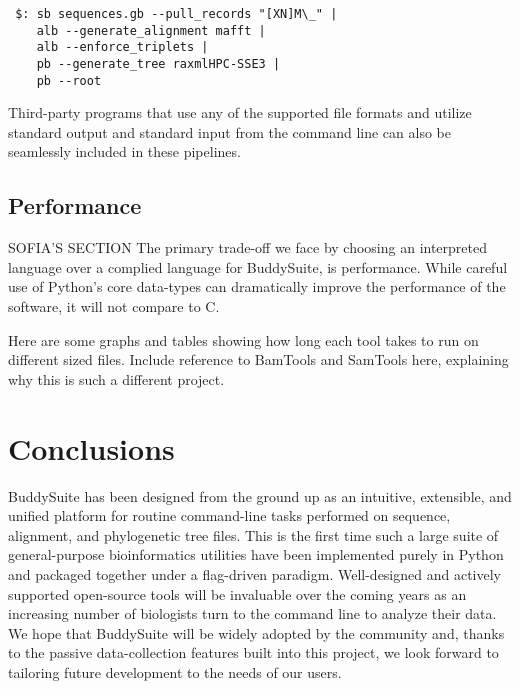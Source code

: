 \documentclass[twocolumn]{bmcart}%
\begin{document}
\smallskip

\begin{verbatim}
 $: sb sequences.gb --pull_records "[XN]M\_" |
    alb --generate_alignment mafft |
    alb --enforce_triplets |
    pb --generate_tree raxmlHPC-SSE3 |
    pb --root
\end{verbatim}

\smallskip

Third-party programs that use any of the supported file formats and utilize standard output and standard input from the command line can also be seamlessly included in these pipelines.

\subsection*{Performance}
SOFIA'S SECTION
The primary trade-off we face by choosing an interpreted language over a complied language for BuddySuite, is performance. While careful use of Python's core data-types can dramatically improve the performance of the software, it will not compare to C. 

Here are some graphs and tables showing how long each tool takes to run on different sized files. Include reference to BamTools and SamTools here, explaining why this is such a different project.

\section*{Conclusions}
BuddySuite has been designed from the ground up as an intuitive, extensible, and unified platform for routine command-line tasks performed on sequence, alignment, and phylogenetic tree files. This is the first time such a large suite of general-purpose bioinformatics utilities have been implemented purely in Python and packaged together under a flag-driven paradigm. Well-designed and actively supported open-source tools will be invaluable over the coming years as an increasing number of biologists turn to the command line to analyze their data. We hope that BuddySuite will be widely adopted by the community and, thanks to the passive data-collection features built into this project, we look forward to tailoring future development to the needs of our users.

\end{document}

